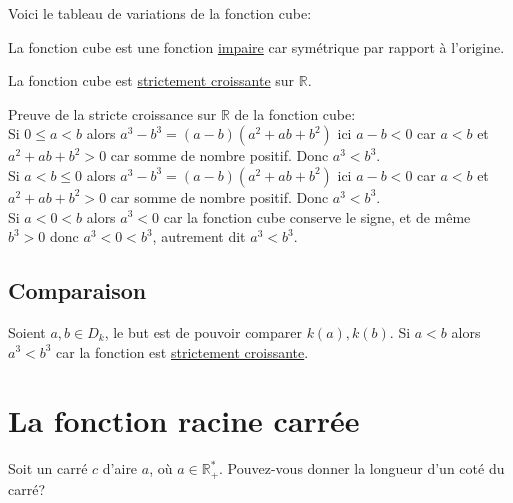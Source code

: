 \documentclass[french]{book}
\begin{document}
Voici le tableau de variations de la fonction cube:
\begin{center}
\end{center}



\begin{prop}
La fonction cube est une fonction \underline{impaire} car symétrique par rapport à l'origine.
\end{prop}

\begin{prop}
La fonction cube est \underline{strictement croissante} sur $\mathbb{R}$. 
\end{prop}


\begin{demo}

Preuve de la stricte croissance sur $\mathbb{R}$ de la fonction cube:\\


Si $0\leq a<b$ alors $a^3-b^3=(a-b)(a^2+ab+b^2) $ ici $a-b< 0$ car $a<b$ et $a^2+ab+b^2>0$ car somme de nombre positif. Donc $a^3<b^3$.\\

Si $a<b \leq 0$ alors $a^3-b^3=(a-b)(a^2+ab+b^2) $ ici $a-b< 0$ car $a<b$ et $a^2+ab+b^2>0$ car somme de nombre positif. Donc $a^3<b^3$.\\

Si $a<0<b$ alors $a^3<0$ car la fonction cube conserve le signe, et de même $b^3>0$ donc $a^3<0<b^3$, autrement dit $a^3<b^3$.

\end{demo}


\subsection*{Comparaison}
Soient $a,b \in D_k$, le but est de pouvoir comparer $k(a),k(b)$.
Si $a<b$ alors $a^3<b^3$ car la fonction est \underline{strictement croissante}.


\section{La fonction racine carrée}

Soit un carré $c$ d'aire $a$, où $a \in \mathbb{R}_+^*$. Pouvez-vous donner la longueur d'un coté du carré?
\end{document}
